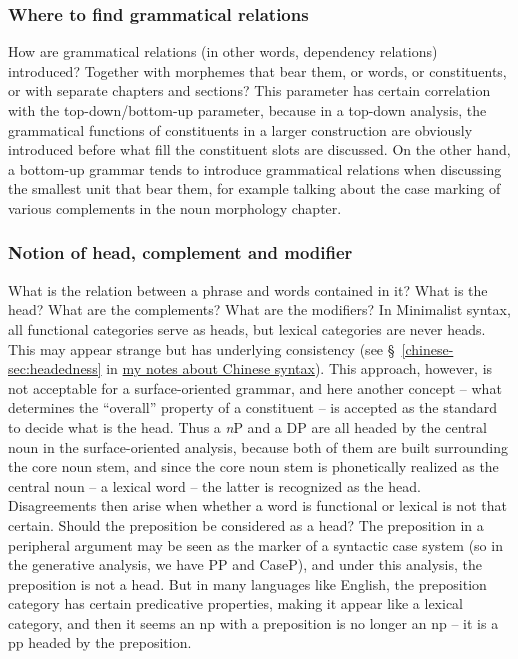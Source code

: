 \documentclass[UTF8, a4paper, oneside, scheme=plain]{ctexart}
\newcommand*{\citesec}[1]{\S~{#1}}
\newcommand*{\term}[1]{\emph{#1}}
\newcommand{\chinesenote}{\href{../Chinese/main.pdf}{my notes about Chinese syntax}}
\begin{document}
\subsubsection{Where to find grammatical relations}

How are grammatical relations (in other words, dependency relations) introduced? 
Together with morphemes that bear them, or words, or constituents, or with separate chapters and sections?
This parameter has certain correlation with the top-down/bottom-up parameter,
because in a top-down analysis,
the grammatical functions of constituents in a larger construction 
are obviously introduced before what fill the constituent slots are discussed.
On the other hand, 
a bottom-up grammar tends to introduce grammatical relations when discussing the smallest unit that bear them,
for example talking about the case marking of various complements in the noun morphology chapter.

\subsubsection{Notion of head, complement and modifier}\label{sec:what-is-head}

What is the relation between a phrase and words contained in it?
What is the head? What are the complements? What are the modifiers?
In Minimalist syntax, all functional categories serve as heads,
but lexical categories are never heads.
This may appear strange but has underlying consistency 
(see \citesec{\ref{chinese-sec:headedness}} in \chinesenote).
This approach, however, is not acceptable for a surface-oriented grammar,
and here another concept -- what determines the ``overall'' property of a constituent -- 
is accepted as the standard to decide what is the head. 
Thus a \term{n}P and a DP are all headed by the central noun in the surface-oriented analysis,
because both of them are built surrounding the core noun stem,
and since the core noun stem is phonetically realized as the central noun -- a lexical word --
the latter is recognized as the head.
Disagreements then arise when whether a word is functional or lexical is not that certain.
Should the preposition be considered as a head? 
The preposition in a peripheral argument may be seen as the marker of a syntactic case system 
(so in the generative analysis, we have PP and CaseP),
and under this analysis, the preposition is not a head.
But in many languages like English, 
the preposition category has certain predicative properties,
making it appear like a lexical category, 
and then it seems an \ac{np} with a preposition is no longer an \ac{np} -- 
it is a \ac{pp} headed by the preposition.
\end{document}
